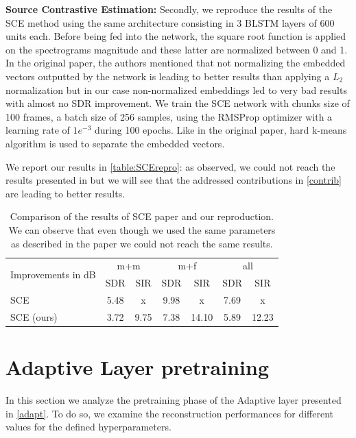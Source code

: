 \documentclass[master, tikz, final,11pt, dvipdfmx]{iscs-thesis}
\begin{document}
\textbf{Source Contrastive Estimation:} Secondly, we reproduce the results of the SCE \cite{SCE} method using the same architecture consisting in 3 BLSTM layers of 600 units each. Before being fed into the network, the square root function is applied on the spectrograms magnitude and these latter are normalized between 0 and 1. In the original paper, the authors mentioned that not normalizing the embedded vectors outputted by the network is leading to better results than applying a $L_2$ normalization but in our case non-normalized embeddings led to very bad results with almost no SDR improvement. We train the SCE network with chunks size of 100 frames, a batch size of 256 samples, using the RMSProp optimizer with a learning rate of $1e^{-3}$ during 100 epochs. Like in the original paper, hard k-means algorithm is used to separate the embedded vectors.

We report our results in \autoref{table:SCErepro}: as observed, we could not reach the results presented in \cite{SCE} but we will see that the addressed contributions in \autoref{contrib} are leading to better results.

\begin{table}[ht]
\centering
\begin{tabular}{l|c|c|c|c|c|c}
\multirow{2}{*}{Improvements in dB }& \multicolumn{2}{c|}{m+m} & \multicolumn{2}{c|}{m+f} & \multicolumn{2}{c}{all} \\ 
\cline{2-7} 
 & SDR & SIR & SDR & SIR & SDR & SIR \\ 
\hline 
SCE \cite{SCE} & 5.48 & x & 9.98 & x & 7.69 & x \\ 
SCE (ours) & 3.72 & 9.75 & 7.38 & 14.10 & 5.89 & 12.23 \\ 
\end{tabular}
\caption[Reproduction of SCE paper results]{Comparison of the results of SCE paper and our reproduction. We can observe that even though we used the same parameters as described in the paper we could not reach the same results.}
\label{table:SCErepro}
\end{table}

\section{Adaptive Layer pretraining}
\label{pre}

In this section we analyze the pretraining phase of the Adaptive layer presented in \autoref{adapt}. To do so, we examine the reconstruction performances for different values for the defined hyperparameters.
\end{document}
